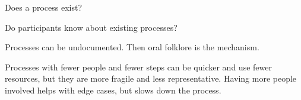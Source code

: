 Does a process exist?

Do participants know about existing processes?

Processes can be undocumented. Then oral folklore is the mechanism. 

Processes with fewer people and fewer steps can be quicker and use fewer resources, but they are more fragile and less representative. Having more people involved helps with edge cases, but slows down the process. 


